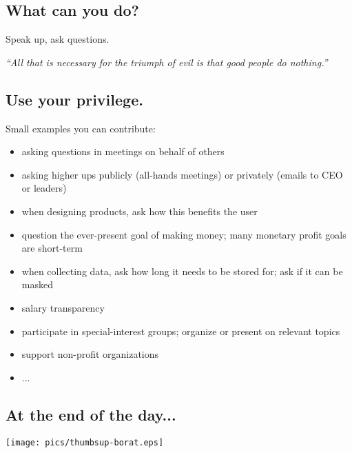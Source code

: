 \documentclass[xga]{xdvislides}
\begin{document}
\subsection{What can you do?}
\Huge
\vspace*{\fill}
\begin{center}

Speak up, ask questions. \\

\vspace{.5in}

{\em ``All that is necessary for the triumph of evil is
that good people do nothing.''} \\

\end{center}
\vspace*{\fill}
\Normalsize

\subsection{Use your privilege.}
Small examples you can contribute:
\begin{itemize}
	\item asking questions in meetings on behalf of others
	\item asking higher ups publicly (all-hands meetings) or
		privately (emails to CEO or leaders)
	\item when designing products, ask how this benefits the user
	\item question the ever-present goal of making money; many monetary profit goals are short-term
	\item when collecting data, ask how long it needs to be stored for; ask if it can be masked
	\item salary transparency
	\item participate in special-interest groups;
		organize or present on relevant topics
	\item support non-profit organizations
	\item ...
\end{itemize}

\subsection{At the end of the day...}
\begin{center}
	\texttt{[image: pics/thumbsup-borat.eps]}
\end{center}
\end{document}
